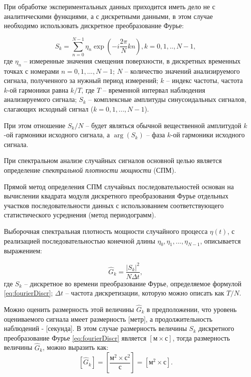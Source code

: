При обработке экспериментальных данных приходится иметь дело не с аналитическими функциями, а с дискретными данными, в этом случае необходимо использовать дискретное преобразование Фурье:

\begin{equation}\label{eq:fourierDiscr}
  S_k=\sum\limits^{N-1}_{n=0}\eta_n\exp(-i\frac{2\pi}{N}kn),
  k=0,1,..,N-1,
\end{equation}
\noindent
где $\eta_n$ -- измеренные значения смещения поверхности, в дискретных временных точках с номерами $n=0,1,...,N-1$;
$N$ -- количество значений анализируемого сигнала, полученного за нужный период измерений;
$k$ -- индекс частоты, частота $k$-ой гармоники равна $k/T$, где $T$ -- временной интервал наблюдения анализируемого сигнала;
$S_k$ -- комплексные амплитуды синусоидальных сигналов, слагающих исходный сигнал ($k=0,1,...,N-1$).

При этом отношение $S_k/N$ -- будет являться обычной вещественной амплитудой $k$-ой гармоники исходного сигнала, а $\arg(S_k)$ -- фаза $k$-ой гармоники исходного сигнала.

При спектральном анализе случайных сигналов основной целью является определение \emph{спектральной плотности мощности} (СПМ).

Прямой метод определения СПМ случайных последовательностей основан на вычислении квадрата модуля дискретного преобразования Фурье отдельных участков последовательности данных с использованием соответствующего статистического усреднения (метод периодограмм).

Выборочная спектральная плотность мощности случайного процесса $\eta(t)$, с реализацией последовательностью конечной длины $\eta_0,\eta_1,...,\eta_{N-1}$, описывается выражением:

\begin{equation}\label{eq:psd}
  \hat{G}_k = \frac{|S_k|^2}{N\Delta t},
\end{equation}
\noindent
где $S_k$ -- дискретное во времени преобразование Фурье, определяемое формулой \eqref{eq:fourierDiscr}; $\Delta t$ -- частота дискретизации, которую можно описать как $T/N$.

Можно оценить размерность этой величины $\hat{G}_k$ в предположении, что уровень оцениваемого сигнала имеет размерность [метр], а продолжительность наблюдений - [секунда]. В этом случае размерность величины $S_k$ дискретного преобразование Фурье \eqref{eq:fourierDiscr} является $[\text{м}\times\text{с}]$, тогда размерность величины $\hat{G}_k$, можно выразить как:
$$
[\hat{G}_k]=\left[\frac{\text{м}^2\times\text{с}^2}{\text{с}}\right]=[\text{м}^2\times\text{с}].
$$


